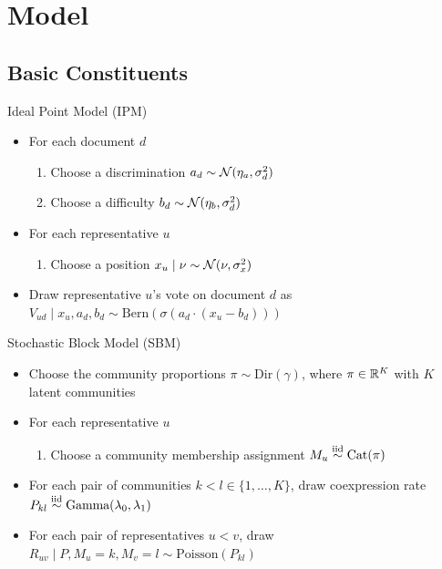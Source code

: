\documentclass{article}
\begin{document}
\section{Model}
\label{model}


\subsection{Basic Constituents}

\noindent Ideal Point Model (IPM)
\begin{itemize}
\item For each document $d$
\begin{enumerate}
\item Choose a discrimination $a_d \sim \mathcal{N}(\eta_{a},\sigma^2_d)$
\item Choose a difficulty $b_d \sim \mathcal{N}(\eta_{b},\sigma^2_d)$
\end{enumerate}
\item For each representative $u$
\begin{enumerate}
\item Choose a position $x_u\mid \nu \sim \mathcal{N}(\nu,\sigma^2_x)$
\end{enumerate}
\item Draw representative $u$'s vote on document $d$ as $V_{ud} \mid x_u, a_d, b_d \sim \text{Bern}(\sigma(a_d\cdot(x_u-b_d)))$%
\end{itemize}


\noindent Stochastic Block Model (SBM)
\begin{itemize}
\item Choose the community proportions $\pi \sim \text{Dir}(\gamma)$, where $\pi\in \mathbb{R}^K$ with $K$ latent communities
\item For each representative $u$
\begin{enumerate}
\item Choose a community membership assignment $M_u\stackrel{\tiny\text{iid}}{\sim} \text{Cat}(\pi)$
\end{enumerate}
\item For each pair of communities $k< l\in\{1,\dots, K\}$, draw coexpression rate $P_{kl} \stackrel{\tiny\text{iid}}{\sim} \text{Gamma}(\lambda_0,\lambda_1)$%
\item For each pair of representatives $u<v$, %
 draw $R_{uv} \mid P, M_u=k, M_v=l\sim \text{Poisson}(P_{kl})$
\end{itemize}
\end{document}
